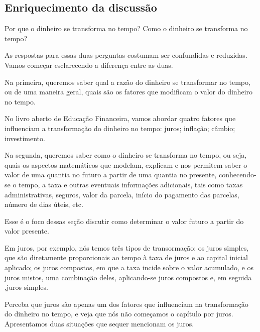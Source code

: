 \begin{paginatexto}
\section*{Enriquecimento da discussão}

Por que o dinheiro se transforma no tempo? Como o dinheiro se transforma no tempo? 

As respostas para essas duas perguntas costumam ser confundidas e reduzidas. Vamos começar esclarecendo a diferença entre as duas.

Na primeira, queremos saber qual a razão do dinheiro se transformar no tempo, ou de uma maneira geral, quais são os fatores que modificam o valor do dinheiro no tempo.

No livro aberto de Educação Financeira, vamos abordar quatro fatores que influenciam a transformação do dinheiro no tempo: juros; inflação; câmbio; investimento.

Na segunda, queremos saber como o dinheiro se transforma no tempo, ou seja, quais os aspectos matemáticos que modelam, explicam e nos permitem saber o valor de uma quantia no futuro a partir de uma quantia no presente, conhecendo-se o tempo, a taxa e outras eventuais informações adicionais, tais como taxas administrativas, seguros, valor da parcela, início do pagamento das parcelas, número de dias úteis, etc.

Esse é o foco dessas seção discutir como determinar o valor futuro a partir do valor presente.

Em juros, por exemplo, nós temos três tipos de transormação: os juros simples, que são diretamente proporcionais ao tempo à taxa de juros e ao capital inicial aplicado; os juros compostos, em que a taxa incide sobre o valor acumulado, e os juros mistos, uma combinação deles, aplicando-se juros compostos e, em seguida ,juros simples.

Perceba que juros são apenas um dos fatores que influenciam na transformação do dinheiro no tempo, e veja que nós não começamos o capítulo por juros. Apresentamos duas situações que sequer mencionam os juros.
\end{paginatexto}



